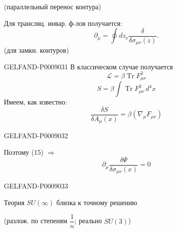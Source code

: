 (параллельный перенос контура)

Для трансляц. инвар. ф-лов получается:
\begin{equation*}
\partial_\mu=\oint dz_\nu\frac{\delta}{\delta\sigma_{\mu\nu}(z)}.
\tag{20}
\end{equation*}
(для замкн. контуров)


\begin{GelfandAdjacentEvidence}{GELFAND-P000903}{1}
В классическом случае получается
\begin{equation*}
\mathcal L=\beta\operatorname{Tr}F_{\mu\nu}^2
\tag{21}
\end{equation*}
\begin{equation*}
S=\beta\int\operatorname{Tr}F_{\mu\nu}^2\,d^4x
\tag{22}
\end{equation*}
Имеем, как известно:
\begin{equation*}
\frac{\delta S}{\delta A_\mu(x)}=\beta(\nabla_\mu F_{\mu\nu})
\tag{23}
\end{equation*}
\end{GelfandAdjacentEvidence}
\begin{GelfandAdjacentEvidence}{GELFAND-P000903}{2}


Поэтому (15) $\Rightarrow$
\begin{equation*}
\partial_\mu\frac{\delta\Psi}{\delta\sigma_{\mu\nu}(x)}=0
\tag{24}
\end{equation*}

\end{GelfandAdjacentEvidence}
\begin{GelfandAdjacentEvidence}{GELFAND-P000903}{3}


Теория $SU(\infty)$ близка к точному решению

(разлож. по степеням $\dfrac{1}{n}$; реально $SU(3)$)
\end{GelfandAdjacentEvidence}
